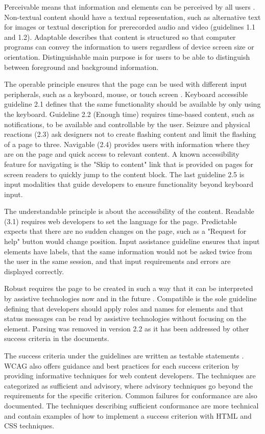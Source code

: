 Perceivable means that information and elements can be perceived by all users \citep{wcag22}. Non-textual content should have a textual representation, such as alternative text for images or textual description for prerecorded audio and video (guidelines 1.1 and 1.2). Adaptable describes that content is structured so that computer programs can convey the information to users regardless of device screen size or orientation. Distinguishable main purpose is for users to be able to distinguish between foreground and background information.

The operable principle ensures that the page can be used with different input peripherals, such as a keyboard, mouse, or touch screen \citep{wcag22}. Keyboard accessible guideline 2.1 defines that the same functionality should be available by only using the keyboard. Guideline 2.2 (Enough time) requires time-based content, such as notifications, to be available and controllable by the user. Seizure and physical reactions (2.3) ask designers not to create flashing content and limit the flashing of a page to three. Navigable (2.4) provides users with information where they are on the page and quick access to relevant content. A known accessibility feature for navigating is the "Skip to content" link that is provided on pages for screen readers to quickly jump to the content block. The last guideline 2.5 is input modalities that guide developers to ensure functionality beyond keyboard input.

The understandable principle is about the accessibility of the content. Readable (3.1) requires web developers to set the language for the page. Predictable expects that there are no sudden changes on the page, such as a "Request for help" button would change position. Input assistance guideline ensures that input elements have labels, that the same information would not be asked twice from the user in the same session, and that input requirements and errors are displayed correctly. 

Robust requires the page to be created in such a way that it can be interpreted by assistive technologies now and in the future \citep{wcag22}. Compatible is the sole guideline defining that developers should apply roles and names for elements and that status messages can be read by assistive technologies without focusing on the element. Parsing was removed in version 2.2 as it has been addressed by other success criteria in the documents.

The success criteria under the guidelines are written as testable statements \citep{wcag22}. WCAG also offers guidance and best practices for each success criterion by providing informative techniques for web content developers. The techniques are categorized as sufficient and advisory, where advisory techniques go beyond the requirements for the specific criterion. Common failures for conformance are also documented. The techniques describing sufficient conformance are more technical and contain examples of how to implement a success criterion with HTML and CSS techniques. 

